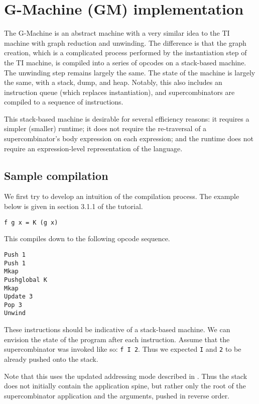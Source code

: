 \section{G-Machine (GM) implementation}
\label{sec:gm}

The G-Machine is an abstract machine with a very similar idea to the TI machine with graph reduction and unwinding. The difference is that the graph creation, which is a complicated process performed by the instantiation step of the TI machine, is compiled into a series of opcodes on a stack-based machine. The unwinding step remains largely the same. The state of the machine is largely the same, with a stack, dump, and heap. Notably, this also includes an instruction queue (which replaces instantiation), and supercombinators are compiled to a sequence of instructions.

This stack-based machine is desirable for several efficiency reasons: it requires a simpler (smaller) runtime; it does not require the re-traversal of a supercombinator's body expression on each expression; and the runtime does not require an expression-level representation of the language.

\subsection{Sample compilation}
\label{sec:gm-walkthrough}

We first try to develop an intuition of the compilation process. The example below is given in section 3.1.1 of the tutorial.

\begin{verbatim}
f g x = K (g x)
\end{verbatim}

This compiles down to the following opcode sequence.

\begin{verbatim}
Push 1
Push 1
Mkap
Pushglobal K
Mkap
Update 3
Pop 3
Unwind
\end{verbatim}

These instructions should be indicative of a stack-based machine. We can envision the state of the program after each instruction. Assume that the supercombinator was invoked like so: \texttt{f I 2}. Thus we expected \texttt{I} and \texttt{2} to be already pushed onto the stack.

Note that this uses the updated addressing mode described in . Thus the stack does not initially contain the application spine, but rather only the root of the supercombinator application and the arguments, pushed in reverse order.

